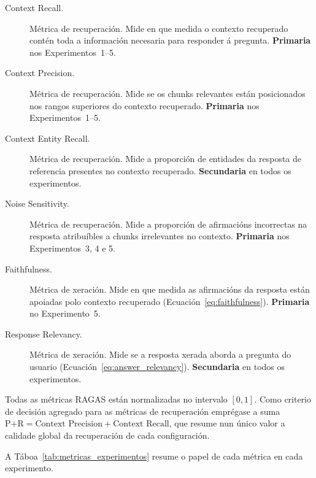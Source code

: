 \documentclass[11pt, a4paper, oneside]{report}
\begin{document}
\begin{description}
  \item[Context Recall.] Métrica de recuperación. Mide en que medida o contexto
    recuperado contén toda a información necesaria para responder á pregunta.
    \textbf{Primaria} nos Experimentos~1--5.

  \item[Context Precision.] Métrica de recuperación. Mide se os chunks relevantes
    están posicionados nos rangos superiores do contexto recuperado.
    \textbf{Primaria} nos Experimentos~1--5.

  \item[Context Entity Recall.] Métrica de recuperación. Mide a proporción de entidades
    da resposta de referencia presentes no contexto recuperado.
    \textbf{Secundaria} en todos os experimentos.

  \item[Noise Sensitivity.] Métrica de recuperación. Mide a proporción de afirmacións
    incorrectas na resposta atribuíbles a chunks irrelevantes no contexto.
    \textbf{Primaria} nos Experimentos~3, 4 e 5.

  \item[Faithfulness.] Métrica de xeración. Mide en que medida as afirmacións da
    resposta están apoiadas polo contexto recuperado (Ecuación~\ref{eq:faithfulness}).
    \textbf{Primaria} no Experimento~5.

  \item[Response Relevancy.] Métrica de xeración. Mide se a resposta xerada aborda
    a pregunta do usuario (Ecuación~\ref{eq:answer_relevancy}).
    \textbf{Secundaria} en todos os experimentos.
\end{description}

Todas as métricas RAGAS están normalizadas no intervalo $[0, 1]$. Como criterio de
decisión agregado para as métricas de recuperación emprégase a suma
$\text{P{+}R} = \text{Context Precision} + \text{Context Recall}$, que resume nun único
valor a calidade global da recuperación de cada configuración.

A Táboa~\ref{tab:metricas_experimentos} resume o papel de cada métrica en cada
experimento.
\end{document}
